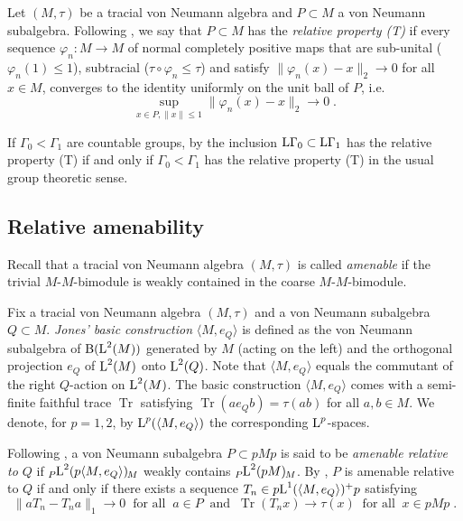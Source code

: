 \documentclass[a4paper,11pt]{amsart}
\numberwithin{equation}{section}
\begin{document}
Let $(M,\tau)$ be a tracial von Neumann algebra and $P \subset M$ a
von Neumann subalgebra. Following \cite[Proposition 4.1]{Po01b}, we
say that $P \subset M$ has the \emph{relative property (T)} if every
sequence ${\varphi}_n : M {\rightarrow} M$ of normal completely positive maps
that are sub-unital (${\varphi}_n(1) {\leqslant} 1$), subtracial ($\tau \circ
{\varphi}_n {\leqslant} \tau$) and satisfy $\|{\varphi}_n(x) - x \|_2 {\rightarrow} 0$ for
all $x \in M$, converges to the identity uniformly on the unit ball
of $P$, i.e.\ $$\sup_{x \in P, \|x\|{\leqslant} 1} \|{\varphi}_n(x) - x \|_2
{\rightarrow} 0 \; .$$

If $\Gamma_0 < \Gamma_1$ are countable groups, by \cite[Proposition
5.1]{Po01b} the inclusion ${\mathord{\text{\rm L}}} \Gamma_0 \subset {\mathord{\text{\rm L}}} \Gamma_1$ has
the relative property (T) if and only if $\Gamma_0 < \Gamma_1$ has
the relative property (T) in the usual group theoretic sense.

\subsection{Relative amenability}\label{subsec.relamen}

Recall that a tracial von Neumann algebra $(M,\tau)$ is called \emph{amenable} if the trivial $M$-$M$-bimodule is weakly contained in the coarse $M$-$M$-bimodule.

Fix a tracial von Neumann algebra $(M,\tau)$ and a von Neumann subalgebra $Q \subset M$. \emph{Jones' basic construction} $\langle M,e_Q \rangle$ is defined as the von Neumann subalgebra of ${\operatorname{B}}({\mathord{\text{\rm L}}}^2(M))$ generated by $M$ (acting on the left) and the orthogonal projection $e_Q$ of ${\mathord{\text{\rm L}}}^2(M)$ onto ${\mathord{\text{\rm L}}}^2(Q)$. Note that $\langle M,e_Q \rangle$ equals the commutant of the right $Q$-action on ${\mathord{\text{\rm L}}}^2(M)$. The basic construction $\langle M,e_Q \rangle$ comes with a semi-finite faithful trace ${\operatorname{Tr}}$ satisfying ${\operatorname{Tr}}(a e_Q b) = \tau(ab)$ for all $a,b \in M$. We denote, for $p = 1,2$, by ${\mathord{\text{\rm L}}}^p(\langle M,e_Q \rangle)$ the corresponding ${\mathord{\text{\rm L}}}^p$-spaces.

Following \cite[Definition 2.2]{OP07}, a von Neumann subalgebra $P \subset pMp$ is said to be \emph{amenable relative to $Q$} if ${\mathord{\raisebox{-0.4ex}[0ex][0ex]{\scriptsize ${P}$}{{{\mathord{\text{\rm L}}}^2(p \langle M,e_Q\rangle)}}\hspace{-0.2ex}\raisebox{-0.4ex}[0ex][0ex]{\scriptsize ${M}$}}}$ weakly contains ${\mathord{\raisebox{-0.4ex}[0ex][0ex]{\scriptsize ${P}$}{{{\mathord{\text{\rm L}}}^2(p M)}}\hspace{-0.2ex}\raisebox{-0.4ex}[0ex][0ex]{\scriptsize ${M}$}}}$. By \cite[Theorem 2.1]{OP07}, $P$ is amenable relative to $Q$ if and only if there exists a sequence $T_n \in p {\mathord{\text{\rm L}}}^1(\langle M,e_Q \rangle)^+ p$ satisfying
$$\|a T_n - T_n a \|_1 {\rightarrow} 0 \;\;\text{for all}\;\; a \in P \;\;\text{and}\;\; {\operatorname{Tr}}(T_n x) {\rightarrow} \tau(x) \;\;\text{for all}\;\; x \in pMp \; .$$
\end{document}
